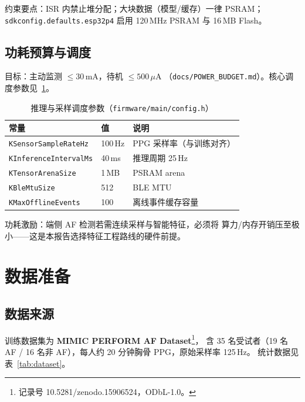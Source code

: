 \documentclass[11pt,a4paper]{ctexart}
\newcommand{\feat}[1]{\texttt{#1}}
\begin{document}
约束要点：ISR 内禁止堆分配；大块数据（模型/缓存）一律 PSRAM；
\feat{sdkconfig.defaults.esp32p4} 启用 120\,MHz PSRAM 与 16\,MB Flash。

\subsection{功耗预算与调度}
\label{sec:power}

目标：主动监测 $\le 30\,\mathrm{mA}$，待机 $\le 500\,\mu\mathrm{A}$
（\feat{docs/POWER\_BUDGET.md}）。核心调度参数见~\ref{tab:schedule}。

\begin{table}[htbp]
\centering
\caption{推理与采样调度参数（\feat{firmware/main/config.h}）}
\label{tab:schedule}
\begin{tabular}{lll}
\toprule
常量 & 值 & 说明 \\
\midrule
\feat{KSensorSampleRateHz} & 100\,Hz & PPG 采样率（与训练对齐） \\
\feat{KInferenceIntervalMs} & 40\,ms & 推理周期 25\,Hz \\
\feat{KTensorArenaSize} & 1\,MB & PSRAM arena \\
\feat{KBleMtuSize} & 512 & BLE MTU \\
\feat{KMaxOfflineEvents} & 100 & 离线事件缓存容量 \\
\bottomrule
\end{tabular}
\end{table}

功耗激励：端侧 AF 检测若需连续采样与智能特征，必须将
算力/内存开销压至极小——这是本报告选择特征工程路线的硬件前提。

\section{数据准备}
\label{sec:data}

\subsection{数据来源}
\label{sec:data-source}

训练数据集为 \textbf{MIMIC PERFORM AF Dataset}\footnote{记录号 10.5281/zenodo.15906524，ODbL-1.0。}，
含 35 名受试者（19 名 AF / 16 名非 AF），每人约 20 分钟胸骨 PPG，原始采样率 125\,Hz。
统计数据见表~\ref{tab:dataset}。
\end{document}
